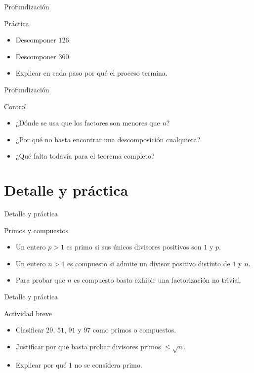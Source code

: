 \documentclass[aspectratio=169,11pt]{beamer}
\begin{document}
\begin{frame}{Profundización}
\begin{block}{Práctica}
\begin{itemize}
  \item Descomponer \(126\).
  \item Descomponer \(360\).
  \item Explicar en cada paso por qué el proceso termina.
\end{itemize}
\end{block}
\end{frame}

\begin{frame}{Profundización}
\begin{block}{Control}
\begin{itemize}
  \item ¿Dónde se usa que los factores son menores que \(n\)?
  \item ¿Por qué no basta encontrar una descomposición cualquiera?
  \item ¿Qué falta todavía para el teorema completo?
\end{itemize}
\end{block}
\end{frame}


\section{Detalle y práctica}

\begin{frame}{Detalle y práctica}
\begin{block}{Primos y compuestos}
\begin{itemize}
  \item Un entero \(p>1\) es primo si sus únicos divisores positivos son \(1\) y \(p\).
  \item Un entero \(n>1\) es compuesto si admite un divisor positivo distinto de \(1\) y \(n\).
  \item Para probar que \(n\) es compuesto basta exhibir una factorización no trivial.
\end{itemize}
\end{block}
\end{frame}

\begin{frame}{Detalle y práctica}
\begin{block}{Actividad breve}
\begin{itemize}
  \item Clasificar \(29\), \(51\), \(91\) y \(97\) como primos o compuestos.
  \item Justificar por qué basta probar divisores primos \(\leq \sqrt{n}\).
  \item Explicar por qué \(1\) no se considera primo.
\end{itemize}
\end{block}
\end{frame}
\end{document}
